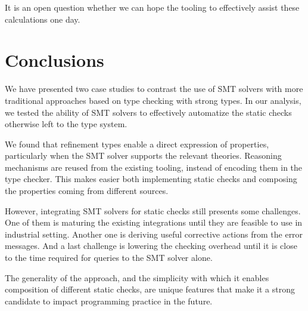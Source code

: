 \documentclass[sigconf, anonymous, review]{acmart}
\begin{document}
It is an open question whether we can hope the tooling to effectively
assist these calculations one day.


\section{Conclusions}
\label{conclusions}

We have presented two case studies to contrast the use of SMT solvers
with more traditional approaches based on type checking with strong types. In
our analysis, we tested the ability of SMT solvers to effectively automatize
the static checks otherwise left to the type system.

We found that refinement types enable a direct expression of properties,
particularly when the SMT solver supports the relevant theories. Reasoning
mechanisms are reused from the existing tooling, instead of encoding them
in the type checker. This makes easier both implementing static checks and
composing the properties coming from different sources.

However, integrating SMT solvers for static checks still presents some
challenges. One of them is maturing the existing integrations until they are
feasible to use in industrial setting. Another one is deriving useful
corrective actions from the error messages. And a last challenge is lowering
the checking overhead until it is close to the time required for queries to
the SMT solver alone.

The generality of the approach, and the simplicity with which it enables
composition of different static checks, are unique features that make it a strong
candidate to impact programming practice in the future.



\end{document}
